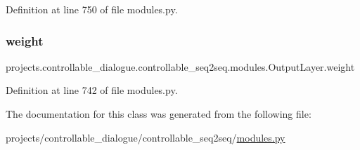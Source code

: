 Definition at line 750 of file modules.\+py.

\mbox{\label{classprojects_1_1controllable__dialogue_1_1controllable__seq2seq_1_1modules_1_1OutputLayer_a8ad4f391aaa9be02856bab9ee805c130}} 
\subsubsection{\texorpdfstring{weight}{weight}}
{\footnotesize\ttfamily projects.\+controllable\+\_\+dialogue.\+controllable\+\_\+seq2seq.\+modules.\+Output\+Layer.\+weight}



Definition at line 742 of file modules.\+py.



The documentation for this class was generated from the following file\+:\begin{DoxyCompactItemize}
\item 
projects/controllable\+\_\+dialogue/controllable\+\_\+seq2seq/\hyperlink{projects_2controllable__dialogue_2controllable__seq2seq_2modules_8py}{modules.\+py}\end{DoxyCompactItemize}
